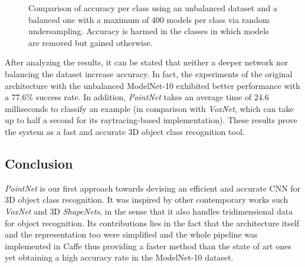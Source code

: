 \begin{figure}[!htb]
    \centering
    \caption{Comparison of accuracy per class using an unbalanced dataset and a balanced one with a maximum of $400$ models per class via random undersampling. Accuracy is harmed in the classes in which models are removed but gained otherwise.}
    \label{fig:objrecog:balunbal}
\end{figure}

After analyzing the results, it can be stated that neither a deeper network nor balancing the dataset increase accuracy. In fact, the experiments of the original architecture with the unbalanced ModelNet-10 exhibited better performance with a $77.6$\% success rate. In addition, \emph{PointNet} takes an average time of $24.6$ milliseconds to classify an example (in comparison with \emph{VoxNet}, which can take up to half a second for its raytracing-based implementation). These results prove the system as a fast and accurate \ac{3D} object class recognition tool.

\subsection{Conclusion}
\label{cha:objrecog:sec:pointnet:subsec:conclusion}

\emph{PointNet} is our first approach towards devising an efficient and accurate \ac{CNN} for \ac{3D} object class recognition. It was inspired by other contemporary works such \emph{VoxNet} and \ac{3D} \emph{ShapeNets}, in the sense that it also handles tridimensional data for object recognition. Its contributions lies in the fact that the architecture itself and the representation too were simplified and the whole pipeline was implemented in Caffe thus providing a faster method than the state of art ones yet obtaining a high accuracy rate in the ModelNet-10 dataset.

